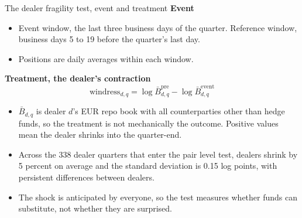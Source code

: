 \documentclass[aspectratio=169,11pt]{beamer}
\begin{document}
\begin{frame}{The dealer fragility test, event and treatment}
  \textbf{Event}
  \begin{itemize}\small
    \item Event window, the last three business days of the quarter. Reference window, business days 5 to 19 before the quarter's last day.
    \item Positions are daily averages within each window.
  \end{itemize}
  \smallskip
  \textbf{Treatment, the dealer's contraction}
  \vspace{-0.4em}
  \[
    \mathrm{windress}_{d,q} = \log \bar B^{\mathrm{pre}}_{d,q} - \log \bar B^{\mathrm{event}}_{d,q}
  \]
  \vspace{-1.1em}
  \begin{itemize}\small
    \item $\bar B_{d,q}$ is dealer $d$'s EUR repo book with all counterparties other than hedge funds, so the treatment is not mechanically the outcome. Positive values mean the dealer shrinks into the quarter-end.
    \item Across the 338 dealer quarters that enter the pair level test, dealers shrink by 5 percent on average and the standard deviation is 0.15 log points, with persistent differences between dealers.
    \item The shock is anticipated by everyone, so the test measures whether funds can substitute, not whether they are surprised.
  \end{itemize}
\end{frame}
\end{document}
